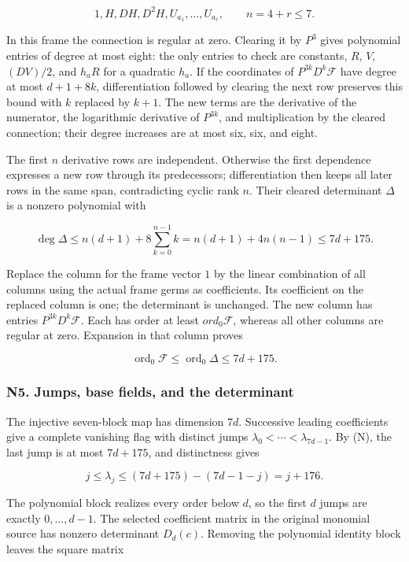 \documentclass[11pt,a4paper]{article}
\begin{document}
\[
1,H,DH,D^2H,U_{a_1},\ldots,U_{a_r},\qquad n=4+r\le7.
\]

In this frame the connection is regular at zero. Clearing it by \(P^{3}\) gives polynomial entries of degree at most eight: the only entries to check are constants, \(R\), \(V\), \((DV)/2\), and \(h_aR\) for a quadratic \(h_a\). If the coordinates of \(P^{3k}D^k\mathcal{F}\) have degree at most \(d+1+8k\), differentiation followed by clearing the next row preserves this bound with \(k\) replaced by \(k+1\). The new terms are the derivative of the numerator, the logarithmic derivative of \(P^{3k}\), and multiplication by the cleared connection; their degree increases are at most six, six, and eight.

The first \(n\) derivative rows are independent. Otherwise the first dependence expresses a new row through its predecessors; differentiation then keeps all later rows in the same span, contradicting cyclic rank \(n\). Their cleared determinant \(Δ\) is a nonzero polynomial with

\[
\deg\Delta\le n(d+1)+8\sum_{k=0}^{n-1}k
=n(d+1)+4n(n-1)\le7d+175.
\]

Replace the column for the frame vector \(1\) by the linear combination of all columns using the actual frame germs as coefficients. Its coefficient on the replaced column is one; the determinant is unchanged. The new column has entries \(P^{3k}D^k\mathcal{F}\). Each has order at least \(ord_{0}\mathcal{F}\), whereas all other columns are regular at zero. Expansion in that column proves

\[
\operatorname{ord}_0\mathcal F\le\operatorname{ord}_0\Delta\le7d+175.\tag{N}
\]

\hypertarget{n5.-jumps-base-fields-and-the-determinant}{%
\subsubsection{N5. Jumps, base fields, and the determinant}\label{n5.-jumps-base-fields-and-the-determinant}}

The injective seven-block map has dimension \(7d\). Successive leading coefficients give a complete vanishing flag with distinct jumps \(λ_{0}<\cdots <λ_{7d-1}\). By (N), the last jump is at most \(7d+175\), and distinctness gives

\[
j\le\lambda_j\le(7d+175)-(7d-1-j)=j+176.
\]

The polynomial block realizes every order below \(d\), so the first \(d\) jumps are exactly \(0,\ldots ,d-1\). The selected coefficient matrix in the original monomial source has nonzero determinant \(D_d(c)\). Removing the polynomial identity block leaves the square matrix
\end{document}
